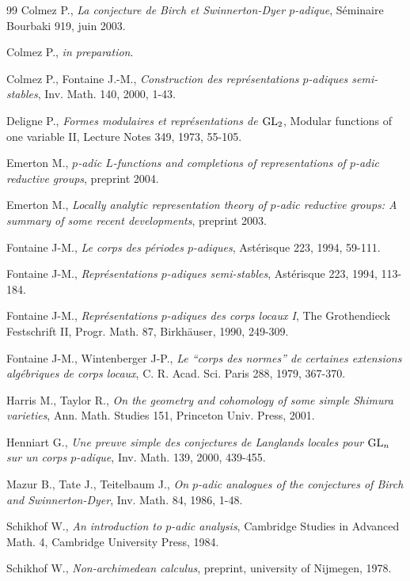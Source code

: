 \documentclass[11pt]{amsart}
\begin{document}
\begin{thebibliography}{99}
 Colmez P., {\it La conjecture de Birch et
  Swinnerton-Dyer $p$-adique}, S\'eminaire Bourbaki 919, juin 2003.
 
 Colmez P., {\it in preparation}.
 
 Colmez P., Fontaine J.-M., {\it Construction des
  repr\'esentations $p$-adiques semi-stables}, Inv. Math. 140, 2000,
  1-43.
 
 Deligne P., {\it Formes modulaires et repr\'esentations
  de ${\rm GL}_2$}, Modular functions of one variable II, Lecture
  Notes 349, 1973, 55-105.
 
 Emerton M., {\it $p$-adic $L$-functions and completions
  of representations of $p$-adic reductive groups}, preprint 2004.
 
 Emerton M., {\it Locally analytic representation theory
  of $p$-adic reductive groups: A summary of some recent
  developments}, preprint 2003.
 
 Fontaine J-M., {\it Le corps des p\'eriodes
  $p$-adiques}, Ast\'erisque 223, 1994, 59-111.
 
 Fontaine J-M., {\it Repr\'esentations $p$-adiques
  semi-stables}, Ast\'erisque 223, 1994, 113-184.
 
 Fontaine J-M., {\it Repr\'esentations $p$-adiques des
  corps locaux I}, The Grothendieck Festschrift II, Progr. Math. 87,
  Birkh\"auser, 1990, 249-309.
 
Fontaine J-M., Wintenberger J-P., {\it Le ``corps des normes'' de
  certaines extensions alg\'ebriques de corps locaux},
C. R. Acad. Sci. Paris 288, 1979, 367-370.
 
 Harris M., Taylor R., {\it On the geometry and cohomology
  of some simple Shimura varieties}, Ann. Math. Studies 151, Princeton
  Univ. Press, 2001.
 
 Henniart G., {\it Une preuve simple des 
conjectures de Langlands locales pour ${\rm GL}_n$ sur un 
corps $p$-adique}, Inv. Math. 139, 2000, 439-455.
 
 Mazur B., Tate J., Teitelbaum J., {\it On $p$-adic
  analogues of the conjectures of Birch and Swinnerton-Dyer},
  Inv. Math. 84, 1986, 1-48.
 
 Schikhof W., {\it An introduction to $p$-adic
  analysis}, Cambridge Studies in Advanced Math. 4, Cambridge
  University Press, 1984.
 

 Schikhof W., {\it Non-archimedean calculus}, preprint,
  university of Nijmegen, 1978.
 


\end{thebibliography}
\end{document}
